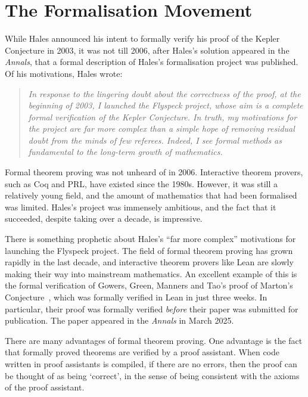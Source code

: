 \section{The Formalisation Movement}

While Hales announced his intent to formally verify his proof of the Kepler Conjecture in 2003, it was not till 2006, after Hales's solution appeared in the \textit{Annals}, that a formal description of Hales's formalisation project was published. Of his motivations, Hales wrote:
\begin{quote}
    \textit{In response to the lingering doubt about the correctness of the proof, at the beginning of 2003, I launched the \emph{Flyspeck} project, whose aim is a complete formal verification of the Kepler Conjecture. In truth, my motivations for the project are far more complex than a simple hope of removing residual doubt from the minds of few referees. Indeed, I see formal methods as fundamental to the long-term growth of mathematics.}~\cite{FlyspeckAnnouncement}
\end{quote}
Formal theorem proving was not unheard of in 2006. Interactive theorem provers, such as Coq and PRL, have existed since the 1980s. However, it was still a relatively young field, and the amount of mathematics that had been formalised was limited. Hales's project was immensely ambitious, and the fact that it succeeded, despite taking over a decade, is impressive.

There is something prophetic about Hales's ``far more complex'' motivations for launching the Flyspeck project. The field of formal theorem proving has grown rapidly in the last decade, and interactive theorem provers like Lean are slowly making their way into mainstream mathematics. An excellent example of this is the formal verification of Gowers, Green, Manners and Tao's proof of Marton's Conjecture~\cite{PFRPublished}, which was formally verified in Lean in just three weeks. In particular, their proof was formally verified \textit{before} their paper was submitted for publication. The paper appeared in the \textit{Annals} in March 2025.

There are many advantages of formal theorem proving. One advantage is the fact that formally proved theorems are verified by a proof assistant. When code written in proof assistants is compiled, if there are no errors, then the proof can be thought of as being `correct', in the sense of  being consistent with the axioms of the proof assistant.

